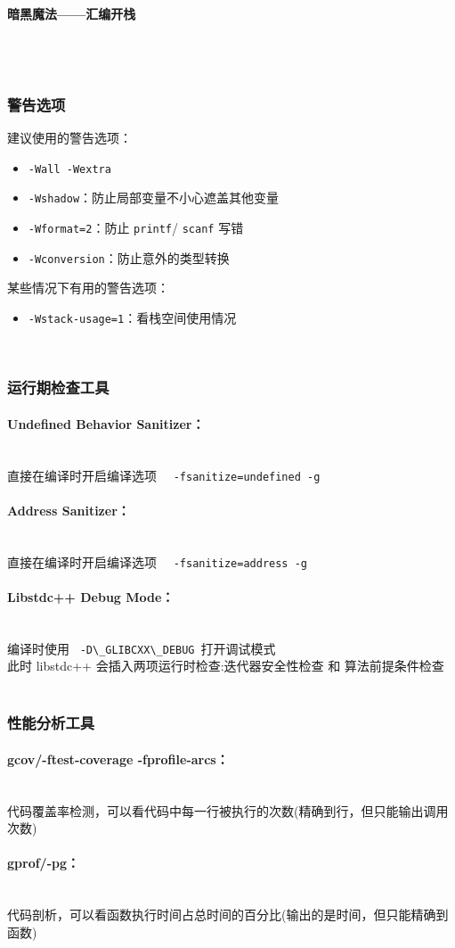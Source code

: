 	\paragraph{暗黑魔法——汇编开栈}~\\
	
	~\\
	\subsubsection{警告选项}
	建议使用的警告选项：
	\begin{itemize}
		\item \lstinline|-Wall -Wextra|
		\item \lstinline|-Wshadow|：防止局部变量不小心遮盖其他变量
		\item \lstinline|-Wformat=2|：防止 \lstinline|printf|/
		\lstinline|scanf| 写错
		\item \lstinline|-Wconversion|：防止意外的类型转换
		\end{itemize}
	某些情况下有用的警告选项：
	\begin{itemize}
		\item \lstinline|-Wstack-usage=1|：看栈空间使用情况
	\end{itemize}
	~\\
	\subsubsection{运行期检查工具}
	\paragraph{Undefined Behavior Sanitizer：}~\\
	直接在编译时开启编译选项~~ \lstinline|-fsanitize=undefined -g|\\
	\paragraph{Address Sanitizer：}~\\
	直接在编译时开启编译选项~~ \lstinline|-fsanitize=address -g|\\
	\paragraph{Libstdc++ Debug Mode：}~\\
	编译时使用~ \lstinline|-D\_GLIBCXX\_DEBUG|~打开调试模式\\
	此时 libstdc++ 会插入两项运行时检查:迭代器安全性检查 和 算法前提条件检查\\
	~\\
	\subsubsection{性能分析工具}
	\paragraph{gcov/-ftest-coverage -fprofile-arcs：}~\\
		代码覆盖率检测，可以看代码中每一行被执行的次数(精确到行，但只能输出调用次数)\\
	\paragraph{gprof/-pg：}~\\
		代码剖析，可以看函数执行时间占总时间的百分比(输出的是时间，但只能精确到函数)\\
%